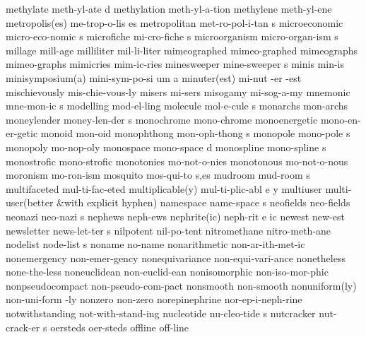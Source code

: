 \NewWordtrue
\5 methylate		meth-yl-ate d		%
\NewWordtrue
\1 methylation		meth-yl-a-tion		%
\NewWordtrue
\1 methylene		meth-yl-ene		%
\2 metropolis(es)	me-trop-o-lis es
\5 metropolitan		met-ro-pol-i-tan s
\5 microeconomic	micro-eco-nomic s
\5 microfiche		mi-cro-fiche s
\5 microorganism	micro-organ-ism s	%
\1 millage		mill-age
\1 milliliter		mil-li-liter
\1 mimeographed 	mimeo-graphed
\1 mimeographs		mimeo-graphs
\1 mimicries		mim-ic-ries
\NewWordtrue
\5 minesweeper		mine-sweeper s		%
\1 minis		min-is
\3 minisymposium(a)	mini-sym-po-si um a
\3 minuter(est)		mi-nut -er -est
\1 mischievously	mis-chie-vous-ly
\1 misers		mi-sers
\1 misogamy		mi-sog-a-my
\5 mnemonic		mne-mon-ic s		%
\1 modelling		mod-el-ling
\5 molecule		mol-e-cule s
\1 monarchs		mon-archs
\5 moneylender		money-len-der s
\1 monochrome		mono-chrome
\1 monoenergetic	mono-en-er-getic
\1 monoid		mon-oid
\5 monophthong		mon-oph-thong s		%
\5 monopole		mono-pole s
\1 monopoly		mo-nop-oly
\5 monospace		mono-space d		%
\5 monospline		mono-spline s
\1 monostrofic		mono-strofic
\1 monotonies		mo-not-o-nies
\1 monotonous		mo-not-o-nous
\1 moronism		mo-ron-ism
\5 mosquito		mos-qui-to s,es
\5 mudroom		mud-room s
\1 multifaceted 	mul-ti-fac-eted
\3 multiplicable(y)	mul-ti-plic-abl e y
\1 multiuser		multi-user\quad (better
\tabalign		&\null\quad with explicit hyphen)\cr
\5 namespace		name-space s		%
\1 neofields		neo-fields
\5 neonazi		neo-nazi s
\1 nephews		neph-ews		%
\3 nephrite(ic)		neph-rit e ic		%
\1 newest		new-est 		%
\5 newsletter		news-let-ter s
\1 nilpotent            nil-po-tent             %
\1 nitromethane		nitro-meth-ane		%
\NewWordtrue
\5 nodelist		node-list s		%
\1 noname		no-name
\1 nonarithmetic	non-ar-ith-met-ic	%
\1 nonemergency 	non-emer-gency
\1 nonequivariance	non-equi-vari-ance
\1 nonetheless		none-the-less        %
\1 noneuclidean 	non-euclid-ean
\1 nonisomorphic	non-iso-mor-phic
\1 nonpseudocompact	non-pseudo-com-pact
\1 nonsmooth		non-smooth
\2 nonuniform(ly)	non-uni-form -ly
\NewWordtrue
\1 nonzero		non-zero		%
\1 norepinephrine	nor-ep-i-neph-rine
\1 notwithstanding	not-with-stand-ing   %
\5 nucleotide		nu-cleo-tide s		%
\5 nutcracker		nut-crack-er s
\1 oersteds		oer-steds
\1 offline		off-line		%
